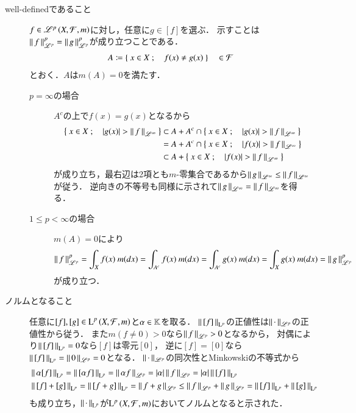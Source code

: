 \begin{prf}\mbox{}
	\begin{description}
		\item[well-definedであること]
			$f \in \mathscr{L}^{p} \left(X,\mathcal{F},m\right)$に対し，任意に$g \in [f]$を選ぶ．
			示すことは$\left\|\, f\, \right\|_{\mathscr{L}^p}^p = \left\|\, g\, \right\|_{\mathscr{L}^p}^p$が成り立つことである．
			\begin{align}
				A \coloneqq \left\{\ x \in X\ ;\quad f(x) \neq g(x)\ \right\} \quad \in \mathcal{F}
			\end{align}
			とおく．$A$は$m(A)=0$を満たす．
			\begin{description}
				\item[$p = \infty$の場合]
					$A^c$の上で$f(x)=g(x)$となるから
					\begin{align}
						\left\{\ x \in X\ ;\quad |g(x)| > \left\|\, f\, \right\|_{\mathscr{L}^\infty}\ \right\} 
						&\subset A + A^c \cap \left\{\ x \in X\ ;\quad |g(x)| > \left\|\, f\, \right\|_{\mathscr{L}^\infty}\ \right\} \\
						&= A + A^c \cap \left\{\ x \in X\ ;\quad |f(x)| > \left\|\, f\, \right\|_{\mathscr{L}^\infty}\ \right\} \\
						&\subset A + \left\{\ x \in X\ ;\quad |f(x)| > \left\|\, f\, \right\|_{\mathscr{L}^\infty}\ \right\}
					\end{align}
					が成り立ち，最右辺は2項とも$m$-零集合であるから$\left\|\, g\, \right\|_{\mathscr{L}^\infty} \leq \left\|\, f\, \right\|_{\mathscr{L}^\infty}$が従う．
					逆向きの不等号も同様に示されて$\left\|\, g\, \right\|_{\mathscr{L}^\infty} = \left\|\, f\, \right\|_{\mathscr{L}^\infty}$を得る．
				\item[$1 \leq p < \infty$の場合]
					$m(A)=0$により
					\begin{align}
						\left\|\, f\, \right\|_{\mathscr{L}^p}^p = \int_X f(x)\ m(dx) = \int_{A^c} f(x)\ m(dx) = \int_{A^c} g(x)\ m(dx) = \int_X g(x)\ m(dx) = \left\|\, g\, \right\|_{\mathscr{L}^p}^p
					\end{align}
					が成り立つ．
			\end{description}
		
		\item[ノルムとなること]
			任意に$[f],[g] \in \operatorname{L}^{p} \left(X,\mathcal{F},m\right)$と$\alpha \in \mathbb{K}$を取る．
			$\left\|\, [f]\, \right\|_{\mathrm{L}^p}$の正値性は$\left\|\, \cdot\, \right\|_{\mathscr{L}^p}$の正値性から従う．
			また$m(f \neq 0) > 0$なら$\left\|\, f\, \right\|_{\mathscr{L}^p} > 0$となるから，
			対偶により$\left\|\, [f]\, \right\|_{\mathrm{L}^p} = 0$なら$[f]$は零元$[0]$，
			逆に$[f] = [0]$なら$\left\|\, [f]\, \right\|_{\mathrm{L}^p} = \left\|\, 0\, \right\|_{\mathscr{L}^p} = 0$となる．
			$\left\|\, \cdot\, \right\|_{\mathscr{L}^p}$の同次性とMinkowskiの不等式から
			\begin{align}
				&\left\|\, \alpha[f]\, \right\|_{\mathrm{L}^p} = \left\|\, [\alpha f]\, \right\|_{\mathrm{L}^p} = \left\|\, \alpha f\, \right\|_{\mathscr{L}^p} = |\alpha|\left\|\, f\, \right\|_{\mathscr{L}^p} = |\alpha|\left\|\, [f]\, \right\|_{\mathrm{L}^p} \\
				&\left\|\, [f] + [g]\, \right\|_{\mathrm{L}^p} = \left\|\, [f + g]\, \right\|_{\mathrm{L}^p} = \left\|\, f + g\, \right\|_{\mathscr{L}^p} \leq \left\|\, f\, \right\|_{\mathscr{L}^p} + \left\|\, g\, \right\|_{\mathscr{L}^p} = \left\|\, [f]\, \right\|_{\mathrm{L}^p} + \left\|\, [g]\, \right\|_{\mathrm{L}^p}
			\end{align}
			も成り立ち，$\left\|\, \cdot\, \right\|_{\mathrm{L}^p}$が$\operatorname{L}^{p} \left(X,\mathcal{F},m\right)$においてノルムとなると示された．
			\QED
	\end{description}
\end{prf}

